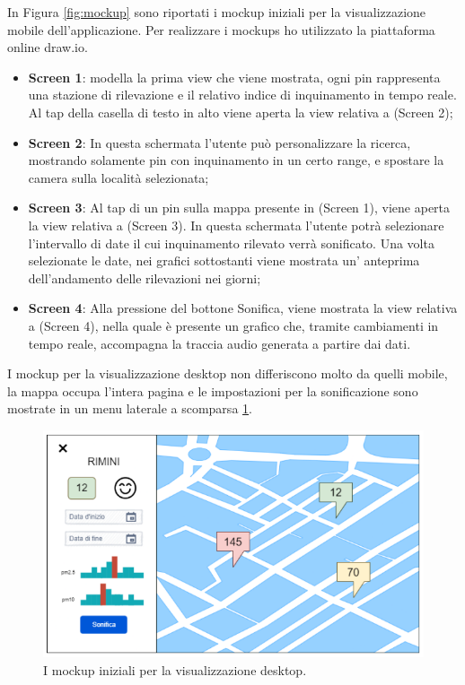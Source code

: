 In Figura \ref{fig:mockup} sono riportati i mockup iniziali per la visualizzazione mobile dell'applicazione.
Per realizzare i mockups ho utilizzato la piattaforma online draw.io.
\begin{itemize}
    \item \textbf{Screen 1}: modella la prima view che viene mostrata, ogni pin rappresenta una stazione di rilevazione e il relativo indice di inquinamento in tempo reale. Al tap della casella di testo in alto viene aperta la view relativa a (Screen 2);
    \item \textbf{Screen 2}: In questa schermata l’utente può personalizzare la ricerca, mostrando solamente pin con inquinamento in un certo range, e spostare la camera sulla località selezionata;
    \item \textbf{Screen 3}: Al tap di un pin sulla mappa presente in (Screen 1), viene aperta la view relativa a (Screen 3). In questa schermata l’utente potrà selezionare l’intervallo di date il cui inquinamento rilevato verrà sonificato. Una volta selezionate le date, nei grafici sottostanti viene mostrata un’ anteprima dell’andamento delle rilevazioni nei giorni;
    \item \textbf{Screen 4}: Alla pressione del bottone Sonifica, viene mostrata la view relativa a (Screen 4), nella quale è presente un grafico che, tramite cambiamenti in tempo reale, accompagna la traccia audio generata a partire dai dati.
\end{itemize}

I mockup per la visualizzazione desktop non differiscono molto da quelli mobile, la mappa occupa l'intera pagina e le impostazioni per la sonificazione sono mostrate in un menu laterale a scomparsa \ref{fig:desktopmockup}.
\begin{figure}[H]
    \includegraphics[width=\linewidth]{img/desktopmockup.PNG}
    \caption{I mockup iniziali per la visualizzazione desktop.}
    \label{fig:desktopmockup}
\end{figure}




